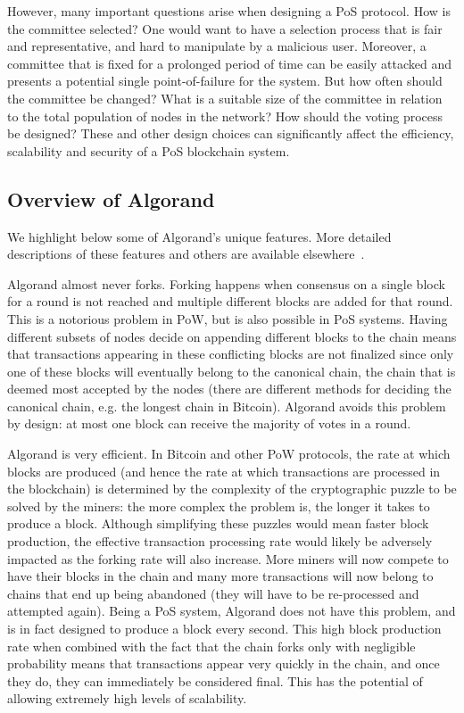 However, many important questions arise when designing a PoS protocol. How is the committee selected? One would want to have a selection process that is fair and representative, and hard to manipulate by a malicious user. Moreover, a committee that is fixed for a prolonged period of time can be easily attacked and presents a potential single point-of-failure for the system. But how often should the committee be changed? What is a suitable size of the committee in relation to the total population of nodes in the network? How should the voting process be designed? These and other design choices can significantly affect the efficiency, scalability and security of a PoS blockchain system. 

\subsection{Overview of Algorand}

We highlight below some of Algorand's unique features. More detailed descriptions of these features and others are available elsewhere~\cite{Chen2018}.

Algorand almost never forks. Forking happens when consensus on a single block for a round is not reached and multiple different blocks are added for that round. This is a notorious problem in PoW, but is also possible in PoS systems. Having different subsets of nodes decide on appending different blocks to the chain means that transactions appearing in these conflicting blocks are not finalized since only one of these blocks will eventually belong to the canonical chain, the chain that is deemed most accepted by the nodes (there are different methods for deciding the canonical chain, e.g. the longest chain in Bitcoin). Algorand avoids this problem by design: at most one block can receive the majority of votes in a round.

Algorand is very efficient. In Bitcoin and other PoW protocols, the rate at which blocks are produced (and hence the rate at which transactions are processed in the blockchain) is determined by the complexity of the cryptographic puzzle to be solved by the miners: the more complex the problem is, the longer it takes to produce a block. Although simplifying these puzzles would mean faster block production, the effective transaction processing rate would likely be adversely impacted as the forking rate will also increase. More miners will now compete to have their blocks in the chain and many more transactions will now belong to chains that end up being abandoned (they will have to be re-processed and attempted again). Being a PoS system, Algorand does not have this problem, and is in fact designed to produce a block every second. This high block production rate when combined with the fact that the chain forks only with negligible probability means that transactions appear very quickly in the chain, and once they do, they can immediately be considered final. This has the potential of allowing extremely high levels of scalability.

